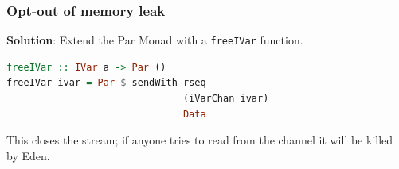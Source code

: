 \documentclass[12pt, danish]{beamer}
\begin{document}
\begin{frame}[fragile]

  \frametitle{Opt-out of memory leak}

  \textbf{Solution}: Extend the Par Monad with a \texttt{freeIVar} function. 

  \begin{lstlisting}[language=Haskell]
freeIVar :: IVar a -> Par ()
freeIVar ivar = Par $ sendWith rseq 
                               (iVarChan ivar) 
                               Data
  \end{lstlisting}

  This closes the stream; if anyone tries to read from the channel it
  will be killed by Eden.  

\end{frame}
\end{document}
